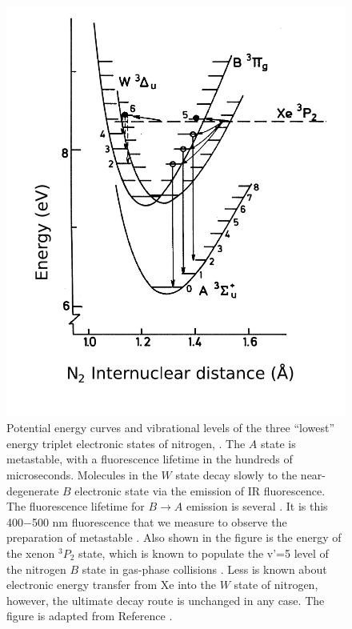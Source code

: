 \documentclass[12pt]{mitthesis}
\begin{document}
\begin{figure}
  \caption{Potential energy curves and vibrational levels of the three
    ``lowest'' energy triplet electronic states of nitrogen, .
    The $A$ state is metastable, with a fluorescence lifetime in the
    hundreds of microseconds.  Molecules in the $W$ state decay slowly
    to the near-degenerate $B$ electronic state via the emission of IR
    fluorescence.  The fluorescence lifetime for $B \rightarrow A$
    emission is several \microsec. It is this 400$-$500 nm
    fluorescence that we measure to observe the preparation of
    metastable .  Also shown in the figure is the energy of the
    xenon $^3P_2$ state, which is known to populate the v'=5 level of
    the nitrogen $B$ state in gas-phase collisions
    \cite{krumpelmann87}.  Less is known about electronic energy
    transfer from Xe into the $W$ state of nitrogen, however, the
    ultimate decay route is unchanged in any case.  The figure is
    adapted from Reference \cite{krumpelmann-thesis}.}
  \label{fig:n2curves}
  \centering
  \includegraphics[width=5in]{n2curves.pdf}
\end{figure}
\end{document}
